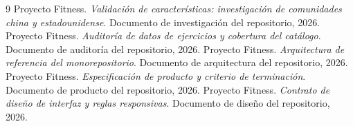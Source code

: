 \documentclass[conference]{IEEEtran}
\begin{document}
\begin{thebibliography}{9}
 Proyecto Fitness. \emph{Validaci\'on de caracter\'isticas:
investigaci\'on de comunidades china y estadounidense}. Documento de
investigaci\'on del repositorio, 2026.
 Proyecto Fitness. \emph{Auditor\'ia de datos de ejercicios y
cobertura del cat\'alogo}. Documento de auditor\'ia del repositorio, 2026.
 Proyecto Fitness. \emph{Arquitectura de referencia del
monorepositorio}. Documento de arquitectura del repositorio, 2026.
 Proyecto Fitness. \emph{Especificaci\'on de producto y criterio
de terminaci\'on}. Documento de producto del repositorio, 2026.
 Proyecto Fitness. \emph{Contrato de dise\~no de interfaz y
reglas responsivas}. Documento de dise\~no del repositorio, 2026.
\end{thebibliography}
\end{document}
